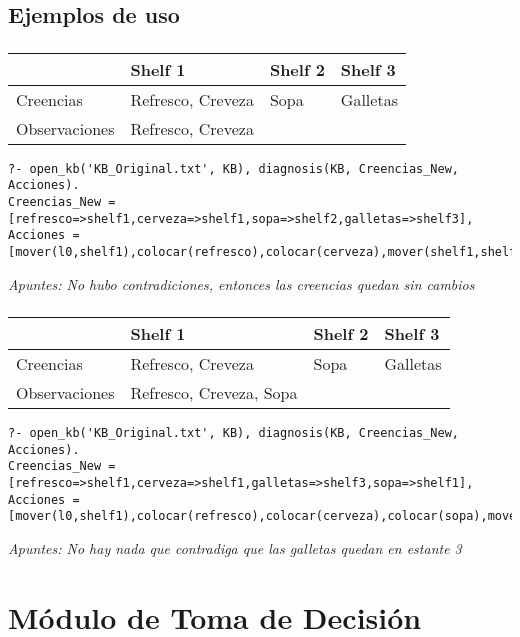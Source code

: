 \documentclass[11pt,fleqn]{article}
\begin{document}
\subsection*{Ejemplos de uso}

\subsubsection{}
	\begin{tabular}{| l | l | l | l |}
		\hline
						& Shelf 1 & Shelf 2 & Shelf 3 \\ \hline
		Creencias		& Refresco, Creveza & Sopa & Galletas \\ \hline
		Observaciones	& Refresco, Creveza & & \\
		\hline
	\end{tabular}
	\begin{lstlisting}
?- open_kb('KB_Original.txt', KB), diagnosis(KB, Creencias_New, Acciones).
Creencias_New = [refresco=>shelf1,cerveza=>shelf1,sopa=>shelf2,galletas=>shelf3],
Acciones = [mover(l0,shelf1),colocar(refresco),colocar(cerveza),mover(shelf1,shelf2),colocar(sopa),mover(shelf2,shelf3),colocar(galletas)],
	\end{lstlisting}
	\textit{Apuntes: No hubo contradiciones, entonces las creencias quedan sin cambios} \\

\subsubsection{}
	\begin{tabular}{| l | l | l | l |}
		\hline
						& Shelf 1 & Shelf 2 & Shelf 3 \\ \hline
		Creencias		& Refresco, Creveza & Sopa & Galletas \\ \hline
		Observaciones	& Refresco, Creveza, Sopa & & \\
		\hline
	\end{tabular}
	\begin{lstlisting}
?- open_kb('KB_Original.txt', KB), diagnosis(KB, Creencias_New, Acciones).
Creencias_New = [refresco=>shelf1,cerveza=>shelf1,galletas=>shelf3,sopa=>shelf1],
Acciones = [mover(l0,shelf1),colocar(refresco),colocar(cerveza),colocar(sopa),mover(shelf1,shelf3),colocar(galletas)],
	\end{lstlisting}
	\textit{Apuntes: No hay nada que contradiga que las galletas quedan en estante 3}

\section{Módulo de Toma de Decisión}
\end{document}
